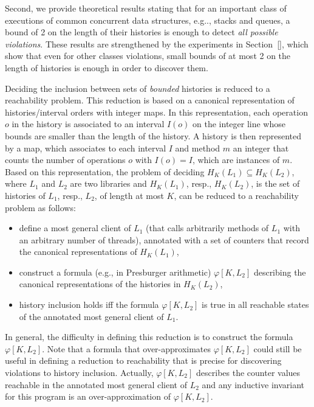 Second, we provide theoretical results stating that for an important class of
executions of common concurrent data structures, e.g.., stacks and queues, a
bound of 2 on the length of their histories is enough to detect \emph{all
possible violations}. These results are strengthened by the experiments in
Section~\ref{}, which show that even for other classes violations, small bounds
of at most 2 on the length of histories is enough in order to discover them.

Deciding the inclusion between sets of \emph{bounded} histories is reduced to a
reachability problem. This reduction is based on a canonical representation of
histories/interval orders with integer maps. In this representation, each
operation $o$ in the history is associated to an interval $I(o)$ on the integer
line whose bounds are smaller than the length of the history. A history is then
represented by a map, which associates to each interval $I$ and method $m$ an
integer that counts the number of operations $o$ with $I(o)=I$, which are
instances of $m$. Based on this representation, the problem of deciding
$H_K(L_1)\subseteq H_K(L_2)$, where $L_1$ and $L_2$ are two libraries and
$H_K(L_1)$, resp., $H_K(L_2)$, is the set of histories of $L_1$, resp., $L_2$,
of length at most $K$, can be reduced to a reachability problem as follows:
\begin{itemize}

	\item define a most general client of $L_1$ (that calls arbitrarily methods
of $L_1$ with an arbitrary number of threads), annotated with a set of counters
that record the canonical representations of $H_K(L_1)$,

	\item construct a formula (e.g., in Presburger arithmetic) $\varphi[K,L_2]$
describing the canonical representations of the histories in $H_K(L_2)$,

	\item history inclusion holds iff the formula $\varphi[K,L_2]$ is true in all
reachable states of the annotated most general client of $L_1$.

\end{itemize}

In general, the difficulty in defining this reduction is to construct the
formula $\varphi[K,L_2]$. Note that a formula that over-approximates
$\varphi[K,L_2]$ could still be useful in defining a reduction to reachability
that is precise for discovering violations to history inclusion. Actually,
$\varphi[K,L_2]$ describes the counter values reachable in the annotated most
general client of $L_2$ and any inductive invariant for this program is an
over-approximation of $\varphi[K,L_2]$.

